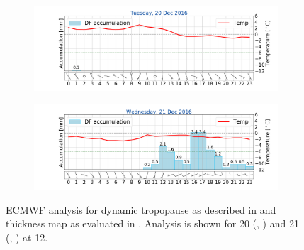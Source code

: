 \begin{figure}[h!]
\begin{subfigure}[b]{0.49\textwidth}
	\end{subfigure}
	\begin{subfigure}[b]{0.49\textwidth}
		\includegraphics[trim={4.9cm 1.cm 1.5cm 1cm},clip,
		width=\textwidth]{./fig_weathermast/T_P_U_20161220}
		\caption{} \label{fig:TPU20}
	\end{subfigure}
	\begin{subfigure}[b]{0.49\textwidth}
		\includegraphics[trim={4.9cm 1.cm 1.5cm 1cm},clip,
		width=\textwidth]{./fig_weathermast/T_P_U_20161221}
		\caption{} \label{fig:TPU21}
	\end{subfigure}
	\caption{ECMWF analysis for dynamic tropopause as described in  and thickness map as evaluated in . Analysis is shown for \num{20} (\protect{}, \protect{}) and \SI{21}{\dec} (\protect{}, \protect{}) at \SI{12}{\UTC}. }
\end{figure}
